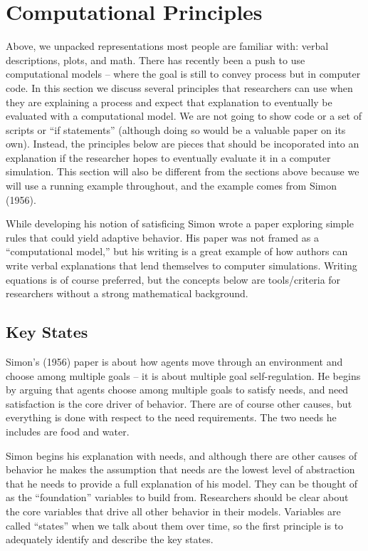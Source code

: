\documentclass[english,,man]{apa6}
\theoremstyle{definition}
\theoremstyle{definition}
\theoremstyle{definition}
\theoremstyle{remark}
\begin{document}
\hypertarget{computational-principles}{%
\section{Computational Principles}\label{computational-principles}}

Above, we unpacked representations most people are familiar with: verbal
descriptions, plots, and math. There has recently been a push to use
computational models -- where the goal is still to convey process but in
computer code. In this section we discuss several principles that
researchers can use when they are explaining a process and expect that
explanation to eventually be evaluated with a computational model. We
are not going to show code or a set of scripts or \enquote{if
statements} (although doing so would be a valuable paper on its own).
Instead, the principles below are pieces that should be incoporated into
an explanation if the researcher hopes to eventually evaluate it in a
computer simulation. This section will also be different from the
sections above because we will use a running example throughout, and the
example comes from Simon (1956).

While developing his notion of satisficing Simon wrote a paper exploring
simple rules that could yield adaptive behavior. His paper was not
framed as a \enquote{computational model,} but his writing is a great
example of how authors can write verbal explanations that lend
themselves to computer simulations. Writing equations is of course
preferred, but the concepts below are tools/criteria for researchers
without a strong mathematical background.

\hypertarget{key-states}{%
\subsection{Key States}\label{key-states}}

Simon's (1956) paper is about how agents move through an environment and
choose among multiple goals -- it is about multiple goal
self-regulation. He begins by arguing that agents choose among multiple
goals to satisfy needs, and need satisfaction is the core driver of
behavior. There are of course other causes, but everything is done with
respect to the need requirements. The two needs he includes are food and
water.

Simon begins his explanation with needs, and although there are other
causes of behavior he makes the assumption that needs are the lowest
level of abstraction that he needs to provide a full explanation of his
model. They can be thought of as the \enquote{foundation} variables to
build from. Researchers should be clear about the core variables that
drive all other behavior in their models. Variables are called
\enquote{states} when we talk about them over time, so the first
principle is to adequately identify and describe the key states.
\end{document}
